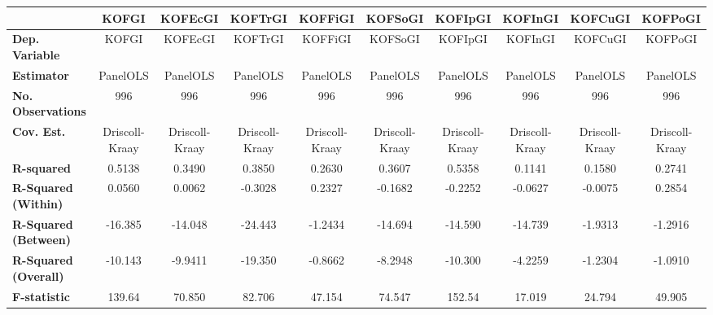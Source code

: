 \begin{center}
\begin{tabular}{lccccccccc}
\toprule
                                   &   \textbf{KOFGI}   &  \textbf{KOFEcGI}  &  \textbf{KOFTrGI}  &  \textbf{KOFFiGI}  &  \textbf{KOFSoGI}  &  \textbf{KOFIpGI}  &  \textbf{KOFInGI}  &  \textbf{KOFCuGI}  &  \textbf{KOFPoGI}   \\
\midrule
\textbf{Dep. Variable}             &       KOFGI        &      KOFEcGI       &      KOFTrGI       &      KOFFiGI       &      KOFSoGI       &      KOFIpGI       &      KOFInGI       &      KOFCuGI       &      KOFPoGI        \\
\textbf{Estimator}                 &      PanelOLS      &      PanelOLS      &      PanelOLS      &      PanelOLS      &      PanelOLS      &      PanelOLS      &      PanelOLS      &      PanelOLS      &      PanelOLS       \\
\textbf{No. Observations}          &        996         &        996         &        996         &        996         &        996         &        996         &        996         &        996         &        996          \\
\textbf{Cov. Est.}                 &   Driscoll-Kraay   &   Driscoll-Kraay   &   Driscoll-Kraay   &   Driscoll-Kraay   &   Driscoll-Kraay   &   Driscoll-Kraay   &   Driscoll-Kraay   &   Driscoll-Kraay   &   Driscoll-Kraay    \\
\textbf{R-squared}                 &       0.5138       &       0.3490       &       0.3850       &       0.2630       &       0.3607       &       0.5358       &       0.1141       &       0.1580       &       0.2741        \\
\textbf{R-Squared (Within)}        &       0.0560       &       0.0062       &      -0.3028       &       0.2327       &      -0.1682       &      -0.2252       &      -0.0627       &      -0.0075       &       0.2854        \\
\textbf{R-Squared (Between)}       &      -16.385       &      -14.048       &      -24.443       &      -1.2434       &      -14.694       &      -14.590       &      -14.739       &      -1.9313       &      -1.2916        \\
\textbf{R-Squared (Overall)}       &      -10.143       &      -9.9411       &      -19.350       &      -0.8662       &      -8.2948       &      -10.300       &      -4.2259       &      -1.2304       &      -1.0910        \\
\textbf{F-statistic}               &       139.64       &       70.850       &       82.706       &       47.154       &       74.547       &       152.54       &       17.019       &       24.794       &       49.905        \\

\end{tabular}
\end{center}
